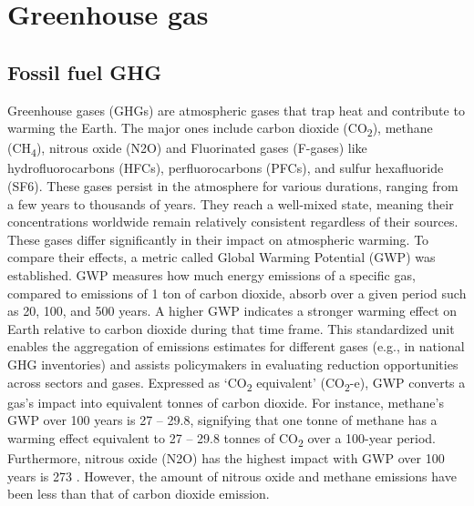 \section{Greenhouse gas}
\subsection{Fossil fuel GHG}

Greenhouse gases (GHGs) are atmospheric gases that trap heat and contribute to warming the Earth. The major ones include carbon dioxide (CO\textsubscript{2}), methane (CH\textsubscript{4}), nitrous oxide (N2O) and Fluorinated gases (F-gases) like hydrofluorocarbons (HFCs), perfluorocarbons (PFCs), and sulfur hexafluoride (SF6). These gases persist in the atmosphere for various durations, ranging from a few years to thousands of years. They reach a well-mixed state, meaning their concentrations worldwide remain relatively consistent regardless of their sources. These gases differ significantly in their impact on atmospheric warming. To compare their effects, a metric called Global Warming Potential (GWP) was established. GWP measures how much energy emissions of a specific gas, compared to emissions of 1 ton of carbon dioxide, absorb over a given period such as 20, 100, and 500 years. A higher GWP indicates a stronger warming effect on Earth relative to carbon dioxide during that time frame. This standardized unit enables the aggregation of emissions estimates for different gases (e.g., in national GHG inventories) and assists policymakers in evaluating reduction opportunities across sectors and gases. Expressed as ‘CO\textsubscript{2} equivalent’ (CO\textsubscript{2}-e), GWP converts a gas's impact into equivalent tonnes of carbon dioxide. For instance, methane's GWP over 100 years is 27 – 29.8, signifying that one tonne of methane has a warming effect equivalent to 27 – 29.8 tonnes of CO\textsubscript{2} over a 100-year period. Furthermore, nitrous oxide (N2O) has the highest impact with GWP over 100 years is 273 \citep{RN3}. However, the amount of nitrous oxide and methane emissions have been less than that of carbon dioxide emission. \par
